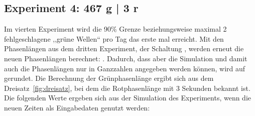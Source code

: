 %

\subsection{Experiment 4: 467 g | 3 r}\label{subsec:experiment-4}

Im vierten Experiment wird die 90\% Grenze beziehungsweise maximal 2 fehlgeschlagene ,,grüne Wellen`` pro Tag das erste mal erreicht.
Mit den Phasenlängen aus dem dritten Experiment, der Schaltung , werden erneut die neuen Phasenlängen berechnet: .
Dadurch, dass aber die Simulation und damit auch die Phasenlängen nur in Ganzzahlen angegeben werden können, wird auf  gerundet.
Die Berechnung der Grünphasenlänge ergibt sich aus dem Dreisatz~\ref{fig:dreisatz}, bei dem die Rotphasenlänge mit 3 Sekunden bekannt ist.
Die folgenden Werte ergeben sich aus der Simulation des Experiments, wenn die neuen Zeiten als Eingabedaten genutzt werden:
